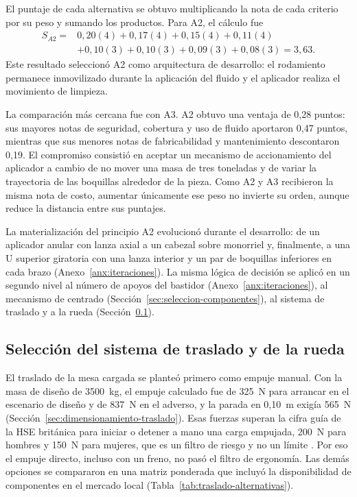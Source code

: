 El puntaje de cada alternativa se obtuvo multiplicando la nota de cada criterio por su peso y sumando los productos. Para A2, el cálculo fue
\[
\begin{aligned}
S_{A2}={}&0{,}20(4)+0{,}17(4)+0{,}15(4)+0{,}11(4)\\
&+0{,}10(3)+0{,}10(3)+0{,}09(3)+0{,}08(3)=3{,}63.
\end{aligned}
\]
Este resultado seleccionó A2 como arquitectura de desarrollo: el rodamiento permanece inmovilizado durante la aplicación del fluido y el aplicador realiza el movimiento de limpieza.

La comparación más cercana fue con A3. A2 obtuvo una ventaja de 0,28 puntos: sus mayores notas de seguridad, cobertura y uso de fluido aportaron 0,47 puntos, mientras que sus menores notas de fabricabilidad y mantenimiento descontaron 0,19. El compromiso consistió en aceptar un mecanismo de accionamiento del aplicador a cambio de no mover una masa de tres toneladas y de variar la trayectoria de las boquillas alrededor de la pieza. Como A2 y A3 recibieron la misma nota de costo, aumentar únicamente ese peso no invierte su orden, aunque reduce la distancia entre sus puntajes.

La materialización del principio A2 evolucionó durante el desarrollo: de un aplicador anular con lanza axial a un cabezal sobre monorriel y, finalmente, a una U superior giratoria con una lanza interior y un par de boquillas inferiores en cada brazo (Anexo~\ref{anx:iteraciones}). La misma lógica de decisión se aplicó en un segundo nivel al número de apoyos del bastidor (Anexo~\ref{anx:iteraciones}), al mecanismo de centrado (Sección~\ref{sec:seleccion-componentes}), al sistema de traslado y a la rueda (Sección~\ref{sec:seleccion-traslado-rueda}).

\subsection{Selección del sistema de traslado y de la rueda}
\label{sec:seleccion-traslado-rueda}

El traslado de la mesa cargada se planteó primero como empuje manual. Con la masa de diseño de 3500~kg, el empuje calculado fue de 325~N para arrancar en el escenario de diseño y de 837~N en el adverso, y la parada en 0,10~m exigía 565~N (Sección~\ref{sec:dimensionamiento-traslado}). Esas fuerzas superan la cifra guía de la HSE británica para iniciar o detener a mano una carga empujada, 200~N para hombres y 150~N para mujeres, que es un filtro de riesgo y no un límite \cite{hsepushpull}. Por eso el empuje directo, incluso con un freno, no pasó el filtro de ergonomía. Las demás opciones se compararon en una matriz ponderada que incluyó la disponibilidad de componentes en el mercado local (Tabla~\ref{tab:traslado-alternativas}).

